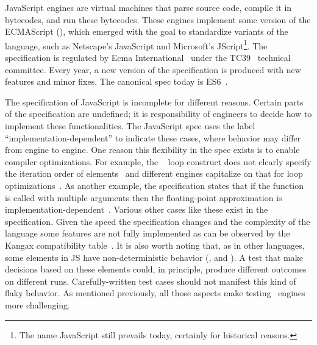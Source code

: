 \documentclass[sigconf,review, anonymous]{acmart}
\begin{document}
JavaScript engines are virtual machines that parse source code,
compile it in bytecodes, and run these bytecodes. These engines
implement some version of the ECMAScript (\es{}), which emerged with
the goal to standardize variants of the language, such as Netscape's
JavaScript and Microsoft's JScript\footnote{The name JavaScript still
  prevails today, certainly for historical reasons.}. The \es{}
specification is regulated by Ecma International~\cite{es6-website}
under the TC39~\cite{tc39-github} technical committee.  Every year, a
new version of the \es{} specification is produced with new features
and minor fixes. The canonical spec today is
ES6~\cite{ecmas262-spec-repo,ecmas262-spec}.


The specification of JavaScript is incomplete for different
reasons. Certain parts of the specification are undefined; it is
responsibility of engineers to decide how to implement these
functionalities. The JavaScript spec uses the label
``implementation-dependent'' to indicate these cases, where behavior
may differ from engine to engine. One reason this flexibility in the
spec exists is to enable compiler optimizations. For example, the
\js\  loop construct does not clearly specify the
iteration order of
elements~\cite{so-forin-undefined,javascript-in-chrome} and different
engines capitalize on that for loop
optimizations~\cite{for-in-undefined}.  As another example, the
specification states that if the 
function is called with multiple arguments then the floating-point
approximation is
implementation-dependent~\cite{es6-toPrecision}. Various other cases
like these exist in the specification. Given the speed the
specification changes and the complexity of the language some features
are not fully implemented as can be observed by the Kangax
compatibility table~\cite{kangax}.  It is also worth noting that, as
in other languages, some elements in JS have non-deterministic
behavior (\eg{},  and ). A test
that make decisions based on these elements could, in principle,
produce different outcomes on different runs. Carefully-written test
cases should not manifest this kind of flaky behavior.  As mentioned
previously, all those aspects make testing \js\ engines more
challenging.
\end{document}

